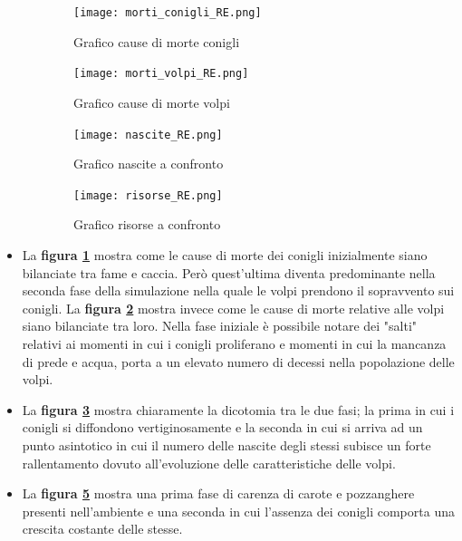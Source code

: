 \documentclass[11pt]{article}
\begin{document}
\begin{figure}[h!]
	\hspace{-8mm}
	\begin{subfigure}{.5\textwidth}
         \centering
         \texttt{[image: morti\_conigli\_RE.png]}
         \caption{Grafico cause di morte conigli}
         \label{fig:morteConigliRE}
	\end{subfigure}
	\begin{subfigure}{.5\textwidth}
		\hspace{7mm}
		\centering
        \texttt{[image: morti\_volpi\_RE.png]}
        \caption{Grafico cause di morte volpi}
        \label{fig:morteVolpiRE}
	\end{subfigure}

	\hspace{-8mm}
	\begin{subfigure}{.5\textwidth}
         \centering
         \texttt{[image: nascite\_RE.png]}
         \caption{Grafico nascite a confronto}
         \label{fig:nasciteRE}
	\end{subfigure}
	\begin{subfigure}{.5\textwidth}
		\hspace{7mm}
		\centering
        \texttt{[image: risorse\_RE.png]}
        \caption{Grafico risorse a confronto}
        \label{fig:risorseRE}
	\end{subfigure}
	 \caption{}
\end{figure}


\begin{itemize}


    \item La \textbf{figura \ref{fig:morteConigliRE}} mostra come le cause di morte dei conigli inizialmente siano bilanciate tra fame e caccia. Però quest'ultima diventa predominante nella seconda fase della simulazione nella quale le volpi prendono il sopravvento sui conigli. La \textbf{figura \ref{fig:morteVolpiRE}} mostra invece come le cause di morte relative alle volpi siano bilanciate tra loro. Nella fase iniziale è possibile notare dei "salti" relativi ai momenti in cui i conigli proliferano e momenti in cui la mancanza di prede e acqua, porta a un elevato numero di decessi nella popolazione delle volpi.


    \item La \textbf{figura \ref{fig:nasciteRE}} mostra chiaramente la dicotomia tra le due fasi; la prima in cui i conigli si diffondono vertiginosamente e la seconda in cui si arriva ad un punto asintotico in cui il numero delle nascite degli stessi subisce un forte rallentamento dovuto all'evoluzione delle caratteristiche delle volpi.


    \item La \textbf{figura \ref{fig:risorseRE}} mostra una prima fase di carenza di carote e pozzanghere presenti nell'ambiente e una seconda in cui l'assenza dei conigli comporta una crescita costante delle stesse.

\end{itemize}
\end{document}
